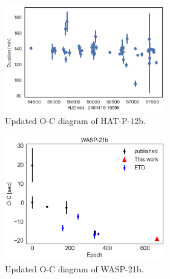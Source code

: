 \begin{figure}
\centering
	\includegraphics[width=7cm]{hatp12/tdv.png}
    \caption{Updated O-C diagram of HAT-P-12b. %
    }
\label{fig:hatp12_tdv}
\end{figure}
\begin{figure}
\centering
	\includegraphics[width=7cm]{wasp21/wasp21_tdv.png}
    \caption{Updated O-C diagram of WASP-21b. %
    }
\label{fig:hatp12_oc}
\end{figure}

